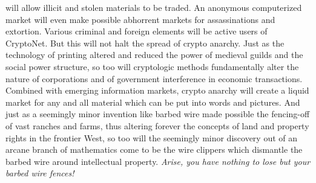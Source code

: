 \documentclass[12pt]{article}
\begin{document}
\begin{flushleft}
\begin{justify}
will allow illicit and stolen materials to be traded. An anonymous computerized
market will even make possible abhorrent markets for assassinations and
extortion. Various criminal and foreign elements will be active users of
CryptoNet. But this will not halt the spread of crypto anarchy.
Just as the technology of printing altered and reduced the power of medieval
guilds and the social power structure, so too will cryptologic methods
fundamentally alter the nature of corporations and of government interference
in economic transactions. Combined with emerging information markets, crypto
anarchy will create a liquid market for any and all material which can be put
into words and pictures. And just as a seemingly minor invention like barbed
wire made possible the fencing-off of vast ranches and farms, thus altering
forever the concepts of land and property rights in the frontier West, so too
will the seemingly minor discovery out of an arcane branch of mathematics come
to be the wire clippers which dismantle the barbed wire around intellectual
property. \textsl{Arise, you have nothing to lose but your barbed wire fences!}
\end{justify}
\end{flushleft}
\end{document}
